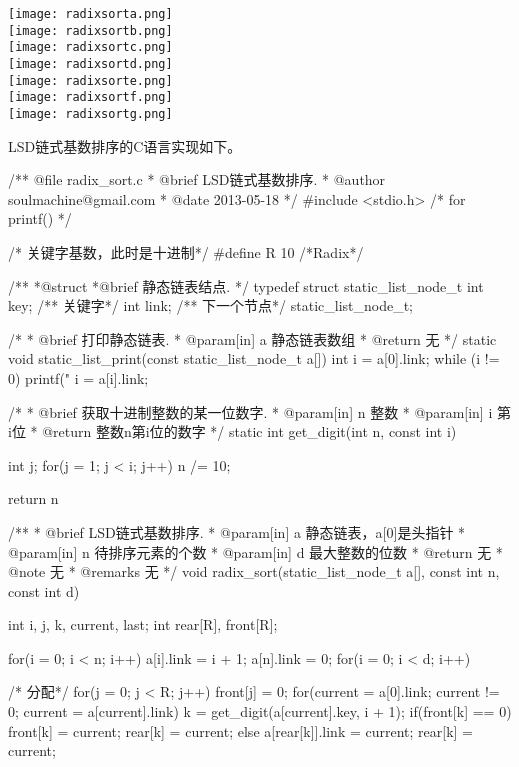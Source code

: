 \begin{center}
\texttt{[image: radixsorta.png]}\\
\texttt{[image: radixsortb.png]}\\
\texttt{[image: radixsortc.png]}\\
\texttt{[image: radixsortd.png]}\\
\texttt{[image: radixsorte.png]}\\
\texttt{[image: radixsortf.png]}\\
\texttt{[image: radixsortg.png]}\\
\label{fig:radixsort}
\end{center}

LSD链式基数排序的C语言实现如下。
\begin{Codex}[label=radix_sort.c]
/** @file radix_sort.c
  * @brief LSD链式基数排序.
  * @author soulmachine@gmail.com
  * @date 2013-05-18
  */
#include <stdio.h>  /* for printf() */

/* 关键字基数，此时是十进制*/
#define R 10  /*Radix*/

/**
  *@struct
  *@brief 静态链表结点.
  */
typedef struct static_list_node_t {
    int key; /** 关键字*/
    int link; /** 下一个节点*/
}static_list_node_t;

 /*
  * @brief 打印静态链表.
  * @param[in] a 静态链表数组
  * @return 无
  */
static void static_list_print(const static_list_node_t a[])
{
    int i = a[0].link;
    while (i != 0) {
        printf("%
        i = a[i].link;
    }
}

 /*
  * @brief 获取十进制整数的某一位数字.
  * @param[in] n 整数
  * @param[in] i 第i位
  * @return 整数n第i位的数字
  */
static int get_digit(int n, const int i)
{
    int j;
    for(j = 1; j < i; j++) {
        n /= 10;
    }

    return n %
}

/**
  * @brief LSD链式基数排序.
  * @param[in] a 静态链表，a[0]是头指针
  * @param[in] n 待排序元素的个数
  * @param[in] d 最大整数的位数
  * @return 无
  * @note 无
  * @remarks 无
  */
void radix_sort(static_list_node_t a[], const int n, const int d)
{
    int i, j, k, current, last;
    int rear[R], front[R];

    for(i = 0; i < n; i++) a[i].link = i + 1;
    a[n].link = 0;
    for(i = 0; i < d; i++) {
        /* 分配*/
        for(j = 0; j < R; j++) front[j] = 0;
        for(current = a[0].link; current != 0;
            current = a[current].link) {
            k = get_digit(a[current].key, i + 1);
            if(front[k] == 0) {
                front[k] = current;
                rear[k] = current;
            } else {
                a[rear[k]].link = current;
                rear[k] = current;
            }
        }

}}
\end{Codex}

